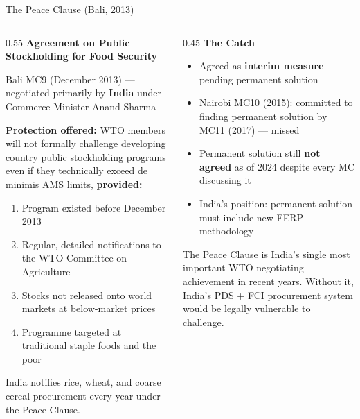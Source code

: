 \documentclass[
  ignorenonframetext,
  aspectratio=169,
]{beamer}
\makeatletter
\providecommand{\tightlist}{%
  \setlength{\itemsep}{0pt}\setlength{\parskip}{0pt}}
\let\quarto@originallabel\label
\DeclareRobustCommand*{\label}[1]{\quarto@originallabel{#1}}
\makeatother
\begin{document}
\begin{frame}{The Peace Clause (Bali, 2013)}
\label{the-peace-clause-bali-2013}
\begin{columns}[T]
\begin{column}{0.55\linewidth}
\textbf{Agreement on Public Stockholding for Food Security}

Bali MC9 (December 2013) --- negotiated primarily by \textbf{India}
under Commerce Minister Anand Sharma

\textbf{Protection offered:} WTO members will not formally challenge
developing country public stockholding programs even if they technically
exceed de minimis AMS limits, \textbf{provided:}

\begin{enumerate}
\tightlist
\item
  Program existed before December 2013
\item
  Regular, detailed notifications to the WTO Committee on Agriculture
\item
  Stocks not released onto world markets at below-market prices
\item
  Programme targeted at traditional staple foods and the poor
\end{enumerate}

India notifies rice, wheat, and coarse cereal procurement every year
under the Peace Clause.
\end{column}

\begin{column}{0.45\linewidth}
\textbf{The Catch}

\begin{itemize}
\tightlist
\item
  Agreed as \textbf{interim measure} pending permanent solution
\item
  Nairobi MC10 (2015): committed to finding permanent solution by MC11
  (2017) --- missed
\item
  Permanent solution still \textbf{not agreed} as of 2024 despite every
  MC discussing it
\item
  India's position: permanent solution must include new FERP methodology
\end{itemize}

The Peace Clause is India's single most important WTO negotiating
achievement in recent years. Without it, India's PDS + FCI procurement
system would be legally vulnerable to challenge.
\end{column}
\end{columns}
\end{frame}
\end{document}
